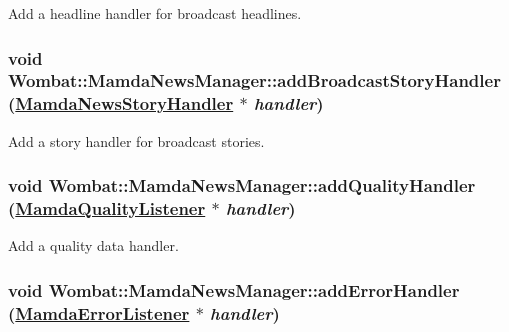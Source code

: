 Add a headline handler for broadcast headlines. 

\hypertarget{classWombat_1_1MamdaNewsManager_2b8b967d8a889c793f74f0a8c852a1d7}{
\subsubsection[addBroadcastStoryHandler]{\setlength{\rightskip}{0pt plus 5cm}void Wombat::Mamda\-News\-Manager::add\-Broadcast\-Story\-Handler (\hyperlink{classWombat_1_1MamdaNewsStoryHandler}{Mamda\-News\-Story\-Handler} $\ast$ {\em handler})}}
\label{classWombat_1_1MamdaNewsManager_2b8b967d8a889c793f74f0a8c852a1d7}


Add a story handler for broadcast stories. 

\hypertarget{classWombat_1_1MamdaNewsManager_6146a9fc547ee5b7beaf22a03457ca34}{
\subsubsection[addQualityHandler]{\setlength{\rightskip}{0pt plus 5cm}void Wombat::Mamda\-News\-Manager::add\-Quality\-Handler (\hyperlink{classWombat_1_1MamdaQualityListener}{Mamda\-Quality\-Listener} $\ast$ {\em handler})}}
\label{classWombat_1_1MamdaNewsManager_6146a9fc547ee5b7beaf22a03457ca34}


Add a quality data handler. 

\hypertarget{classWombat_1_1MamdaNewsManager_28c886b6b2eb8467f1972c9cfaed705f}{
\subsubsection[addErrorHandler]{\setlength{\rightskip}{0pt plus 5cm}void Wombat::Mamda\-News\-Manager::add\-Error\-Handler (\hyperlink{classWombat_1_1MamdaErrorListener}{Mamda\-Error\-Listener} $\ast$ {\em handler})}}
\label{classWombat_1_1MamdaNewsManager_28c886b6b2eb8467f1972c9cfaed705f}



